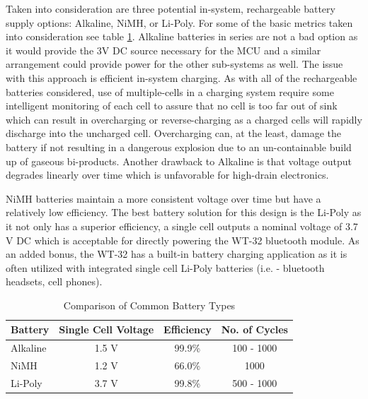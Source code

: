 Taken into consideration are three potential in-system, rechargeable battery supply options: Alkaline, NiMH, or Li-Poly. For some of the basic metrics taken into consideration see table \ref{tab:battery comparison}. Alkaline batteries in series are not a bad option as it would provide the 3V DC source necessary for the MCU and a similar arrangement could provide power for the other sub-systems as well. The issue with this approach is efficient in-system charging. As with all of the rechargeable batteries considered, use of multiple-cells in a charging system require some intelligent monitoring of each cell to assure that no cell is too far out of sink which can result in overcharging or reverse-charging as a charged cells will rapidly discharge into the uncharged cell. Overcharging can, at the least, damage the battery if not resulting in a dangerous explosion due to an un-containable build up of gaseous bi-products. Another drawback to Alkaline is that voltage output degrades linearly over time which is unfavorable for high-drain electronics. 

NiMH batteries maintain a more consistent voltage over time but have a relatively low efficiency. The best battery solution for this design is the Li-Poly as it not only has a superior efficiency, a single cell outputs a nominal voltage of 3.7 V DC which is acceptable for directly powering the WT-32 bluetooth module. As an added bonus, the WT-32 has a built-in battery charging application as it is often utilized with integrated single cell Li-Poly batteries (i.e. - bluetooth headsets, cell phones). 
  
\begin{table}[bhp]
\caption[Common Battery Types]{Comparison of Common Battery Types\cite{web:bat_tech}}
\small
\begin{center}
\begin{tabular}{l| c c c}
\setlength{\tabcolsep}{1pt}
	Battery     & Single Cell Voltage   & Efficiency & No. of Cycles\\\hline
	Alkaline & 1.5 V                    & 99.9\%        & 100 - 1000\\             
	NiMH     & 1.2 V                    & 66.0\%        & 1000      \\            
  Li-Poly  & 3.7 V		                & 99.8\%        & 500 - 1000 
\end{tabular}
\end{center}
\label{tab:battery comparison}
\end{table}

